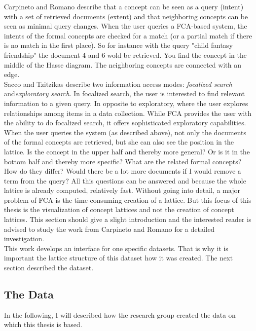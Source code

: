 \documentclass[11pt]{report}
\begin{document}
Carpineto and Romano \cite{Carpineto2005} describe that a concept can be seen as a query (intent) with a set of retrieved documents (extent) and that neighboring concepts can be seen as minimal query changes. When the user queries a FCA-based system, the intents of the formal concepts are checked for a match (or a partial match if there is no match in the first place). So for instance with the query "child fantasy friendship" the document 4 and 6 wold be retrieved. You find the concept in the middle of the Hasse diagram. The neighboring concepts are connected with an edge. \\


Sacco and Tzitzikas \cite{Sacco2009} describe two information access modes: \textit{focalized search} and\textit{exploratory search}. In focalized search, the user is interested to find relevant information to a given query. In opposite to exploratory, where the user explores relationships among items in a data collection. While FCA provides the user with the ability to do focalized search, it offers sophisticated exploratory capabilities. When the user queries the system (as described above), not only the documents of the formal concepts are retrieved, but she can also see the position in the lattice. Is the concept in the upper half and thereby more general? Or is it in the bottom half and thereby more specific? What are the related formal concepts? How do they differ? Would there be a lot more documents if I would remove a term from the query? All this questions can be answered and because the whole lattice is already computed, relatively fast. Without going into detail, a major problem of FCA is the time-consuming creation of a lattice. But this focus of this thesis is the visualization of concept lattices and not the creation of concept lattices. This section should give a slight introduction and the interested reader is advised to study the work from Carpineto and Romano \cite{carpineto2004concept} for a detailed investigation. \\

This work develops an interface for one specific datasets. That is why it is important the lattice structure of this dataset how it was created. The next section described the dataset.

\subsection{The Data}
In the following, I will described how the research group created the data on which this thesis is based. \\
\end{document}
